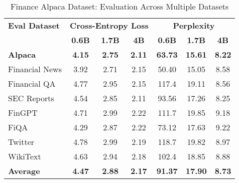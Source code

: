 
\begin{table}[htbp]
\centering
\caption[Finance Alpaca: Evaluation Results]{Finance Alpaca Dataset: Evaluation Across Multiple Datasets}
\label{tab:alpaca_results}
\begin{tabular}{l|ccc|ccc}
\hline
\textbf{Eval Dataset} & \multicolumn{3}{c|}{\textbf{Cross-Entropy Loss}} & \multicolumn{3}{c}{\textbf{Perplexity}} \\
\cline{2-4} \cline{5-7}
  & \textbf{0.6B} & \textbf{1.7B} & \textbf{4B} & \textbf{0.6B} & \textbf{1.7B} & \textbf{4B} \\
\textbf{Alpaca} & \textbf{4.15} & \textbf{2.75} & \textbf{2.11} & \textbf{63.73} & \textbf{15.61} & \textbf{8.22} \\
Financial News & 3.92 & 2.71 & 2.15 & 50.40 & 15.05 & 8.58 \\
Financial QA & 4.77 & 2.95 & 2.15 & 117.4 & 19.11 & 8.56 \\
SEC Reports & 4.54 & 2.85 & 2.11 & 93.56 & 17.26 & 8.25 \\
FinGPT & 4.71 & 2.99 & 2.22 & 111.7 & 19.85 & 9.18 \\
FiQA & 4.29 & 2.87 & 2.22 & 73.12 & 17.63 & 9.22 \\
Twitter & 4.78 & 2.99 & 2.19 & 118.7 & 19.82 & 8.97 \\
WikiText & 4.63 & 2.94 & 2.18 & 102.4 & 18.85 & 8.88 \\
\hline
\textbf{Average} & \textbf{4.47} & \textbf{2.88} & \textbf{2.17} & \textbf{91.37} & \textbf{17.90} & \textbf{8.73} \\
\hline
\end{tabular}
\end{table}
